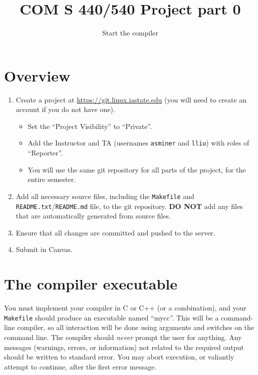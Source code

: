 \documentclass{article}
\title{COM S 440/540 Project part 0}
\author{Start the compiler}
\date{}
\newcommand{\compiler}{mycc}
\begin{document}
\maketitle

\section{Overview}

\begin{enumerate}

\item
Create a project at
\url{https://git.linux.iastate.edu}
(you will need to create an account if you do not have one).
  \begin{itemize}
    \item
    Set the ``Project Visibility'' to ``Private''.

    \item
    Add the Instructor and TA
    (usernames {\tt asminer} and {\tt lliu})
    with roles of ``Reporter''.
    
    \item
    You will use the same git repository for all parts of the project,
    for the entire semester.
  \end{itemize}

\item
Add all necessary source files, including the {\tt Makefile}
and {\tt README.txt}/{\tt README.md}  file, to the git repository.
{\bf DO NOT} add any files that are automatically generated
from source files.

\item
Ensure that all changes are committed and pushed to the server.

\item
Submit in Canvas.

\end{enumerate}

\section{The compiler executable}

You must implement your compiler in C or C++ (or a combination),
and your {\tt Makefile} should produce an executable
named ``\compiler''.
This will be a command-line compiler, so all interaction will be done
using arguments and switches on the command line.
The compiler should \emph{never} prompt the user for anything.
Any messages (warnings, errors, or information)
not related to the required output
should be written to standard error.
You may abort execution, or valiantly attempt to continue,
after the first error message.
\end{document}
